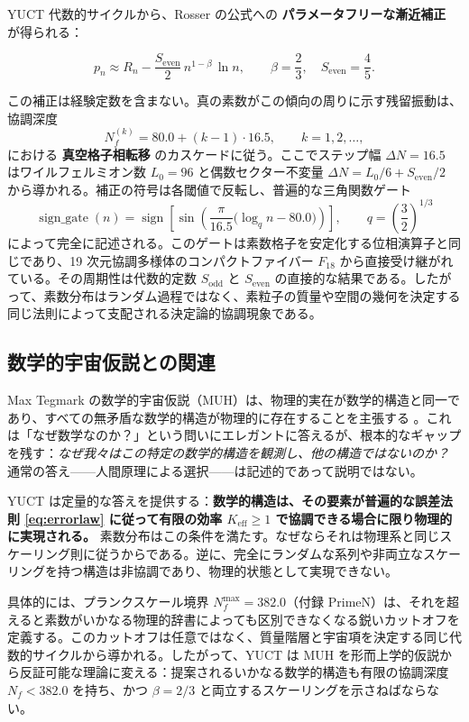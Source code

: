 \documentclass[11pt,a4paper]{article}
\begin{document}
	YUCT 代数的サイクルから、Rosser の公式への \textbf{パラメータフリーな漸近補正} が得られる：
	
	\begin{equation}
		\boxed{ p_n \approx R_n - \frac{S_{\mathrm{even}}}{2}\, n^{1-\beta}\,\ln n },
		\qquad \beta = \frac{2}{3},\quad S_{\mathrm{even}}=\frac{4}{5}.
		\label{eq:prime-yuct-theory}
	\end{equation}
	
	この補正は経験定数を含まない。真の素数がこの傾向の周りに示す残留振動は、協調深度
	\[
	N_f^{(k)} = 80.0 + (k-1)\cdot 16.5, \qquad k=1,2,\dots,
	\]
	における \textbf{真空格子相転移} のカスケードに従う。ここでステップ幅 \(\Delta N = 16.5\) はワイルフェルミオン数 \(L_0=96\) と偶数セクター不変量 \(\Delta N = L_0/6 + S_{\mathrm{even}}/2\) から導かれる。補正の符号は各閾値で反転し、普遍的な三角関数ゲート
	\[
	\operatorname{sign\_gate}(n) = \operatorname{sign}\!\left[\sin\!\left(\frac{\pi}{16.5}\bigl(\log_q n - 80.0\bigr)\right)\right],
	\qquad q = \left(\frac{3}{2}\right)^{1/3}
	\]
	によって完全に記述される。このゲートは素数格子を安定化する位相演算子と同じであり、19 次元協調多様体のコンパクトファイバー \(F_{18}\) から直接受け継がれている。その周期性は代数的定数 \(S_{\mathrm{odd}}\) と \(S_{\mathrm{even}}\) の直接的な結果である。したがって、素数分布はランダム過程ではなく、素粒子の質量や空間の幾何を決定する同じ法則によって支配される決定論的協調現象である。
	
	\subsection{数学的宇宙仮説との関連}
	
	Max Tegmark の数学的宇宙仮説（MUH）は、物理的実在が数学的構造と同一であり、すべての無矛盾な数学的構造が物理的に存在することを主張する \cite{Tegmark2014}。これは「なぜ数学なのか？」という問いにエレガントに答えるが、根本的なギャップを残す：\emph{なぜ我々はこの特定の数学的構造を観測し、他の構造ではないのか？} 通常の答え——人間原理による選択——は記述的であって説明ではない。
	
	YUCT は定量的な答えを提供する：\textbf{数学的構造は、その要素が普遍的な誤差法則 \eqref{eq:errorlaw} に従って有限の効率 \(K_{\mathrm{eff}} \ge 1\) で協調できる場合に限り物理的に実現される。} 素数分布はこの条件を満たす。なぜならそれは物理系と同じスケーリング則に従うからである。逆に、完全にランダムな系列や非両立なスケーリングを持つ構造は非協調であり、物理的状態として実現できない。
	
	具体的には、プランクスケール境界 \(N_f^{\max} = 382.0\)（付録 PrimeN）は、それを超えると素数がいかなる物理的辞書によっても区別できなくなる鋭いカットオフを定義する。このカットオフは任意ではなく、質量階層と宇宙項を決定する同じ代数的サイクルから導かれる。したがって、YUCT は MUH を形而上学的仮説から反証可能な理論に変える：提案されるいかなる数学的構造も有限の協調深度 \(N_f < 382.0\) を持ち、かつ \(\beta = 2/3\) と両立するスケーリングを示さねばならない。
	
\end{document}
